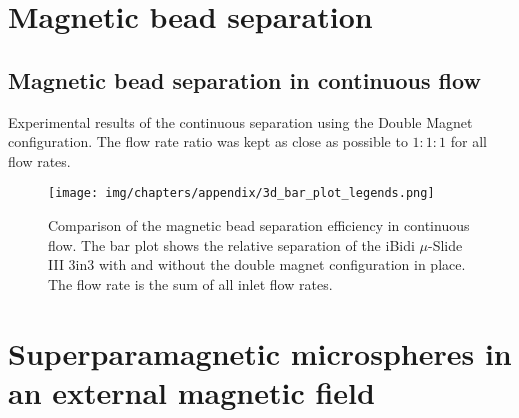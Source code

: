 \newpage

\chapter{Magnetic bead separation}\label{sec:magneticBeadSeparationAppendix}
\section{Magnetic bead separation in continuous flow}
Experimental results of the continuous separation using the Double Magnet configuration. The flow rate ratio was kept as close as possible to $1:1:1$ for all flow rates.
\begin{figure}[htb!]
	\centering
	\texttt{[image: img/chapters/appendix/3d\_bar\_plot\_legends.png]}
	\label{fig:continuousSeparationEfficiency}
	\caption[Comparison of the magnetic bead separation efficiency in continuous flow with and without the Double Magnet configuration]{Comparison of the magnetic bead separation efficiency in continuous flow. The bar plot shows the relative separation of the iBidi $\mu$-Slide III 3in3 with and without the double magnet configuration in place. The flow rate is the sum of all inlet flow rates.}
\end{figure}

\newpage

\chapter{Superparamagnetic microspheres in an external magnetic field}\label{sec:superparamagneticMicrospheresInAnExternalMagneticField}

